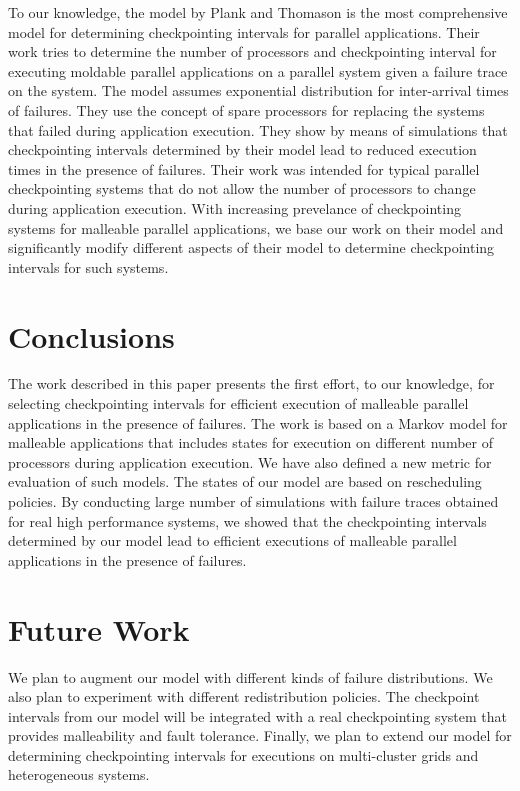 \documentclass[conference,10pt]{IEEEtran}
\begin{document}
To our knowledge, the model by Plank and
Thomason\cite{plank-processorallocation-jpdc01} is the most
comprehensive model for determining checkpointing intervals for
parallel applications. Their work tries to determine the number of
processors and checkpointing interval for executing moldable parallel
applications on a parallel system given a failure trace on the
system. The model assumes exponential distribution for inter-arrival
times of failures. They use the concept of spare processors for
replacing the systems that failed during application execution. They
show by means of simulations that checkpointing intervals determined
by their model lead to reduced execution times in the presence of
failures. Their work was intended for typical parallel checkpointing
systems that do not allow the number of processors to change during
application execution. With increasing prevelance of checkpointing
systems for malleable parallel applications, we base our work on their
model and significantly modify different aspects of their model to
determine checkpointing intervals for such systems.

\section{Conclusions}
\label{conclusions}

The work described in this paper presents the first effort, to our
knowledge, for selecting checkpointing intervals for efficient
execution of malleable parallel applications in the presence of failures. The work
is based on a Markov model for malleable applications that includes
states for execution on different number of processors during
application execution. We have also defined a new metric for
evaluation of such models. The states of our model are based on
rescheduling policies. By conducting large number of simulations with
failure traces obtained for real high performance systems, we showed
that the checkpointing intervals determined by our model lead to
efficient executions of malleable parallel applications in the
presence of failures.

\section{Future Work}
\label{futurework}

We plan to augment our model with different kinds of failure
distributions. We also plan to experiment with different
redistribution policies. The checkpoint intervals from our model will
be integrated with a real checkpointing system that provides
malleability and fault tolerance. Finally, we plan to extend our model
for determining checkpointing intervals for executions on
multi-cluster grids and heterogeneous systems.




\end{document}
